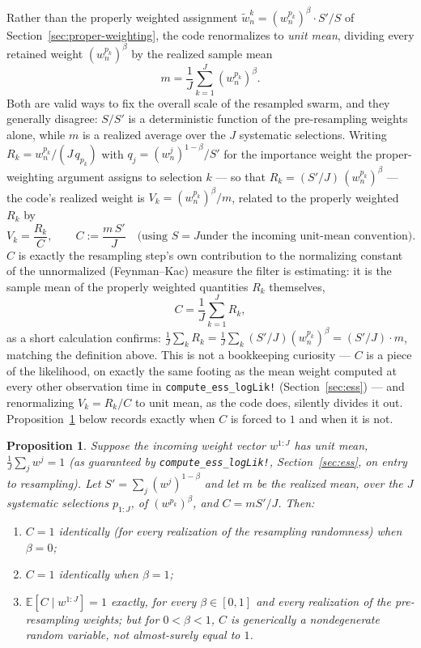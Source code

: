 \documentclass[11pt]{article}
\newtheorem{proposition}{Proposition}
\newcommand{\E}{\mathbb{E}}
\begin{document}
Rather than the properly weighted assignment $\tilde w_n^k = (w_n^{p_k})^\beta
\cdot S'/S$ of Section~\ref{sec:proper-weighting}, the code renormalizes to
\emph{unit mean}, dividing every retained weight $(w_n^{p_k})^\beta$ by the
realized sample mean
\[
m = \frac1J\sum_{k=1}^J (w_n^{p_k})^\beta.
\]
Both are valid ways to fix the overall scale of the resampled swarm, and
they generally disagree: $S/S'$ is a deterministic function of the
pre-resampling weights alone, while $m$ is a realized average over the $J$
systematic selections. Writing $R_k = w_n^{p_k}\big/(J\,q_{p_k})$ with
$q_j=(w_n^j)^{1-\beta}/S'$ for the importance weight the proper-weighting
argument assigns to selection $k$ — so that $R_k = (S'/J)\,(w_n^{p_k})^\beta$
— the code's realized weight is $V_k = (w_n^{p_k})^\beta/m$, related to the
properly weighted $R_k$ by
\[
V_k = \frac{R_k}{C}, \qquad C := \frac{m\,S'}{J} \quad \text{(using $S=J$
under the incoming unit-mean convention).}
\]
$C$ is exactly the resampling step's own contribution to the normalizing
constant of the unnormalized (Feynman--Kac) measure the filter is
estimating: it is the sample mean of the properly weighted quantities $R_k$
themselves,
\[
C = \frac1J\sum_{k=1}^J R_k,
\]
as a short calculation confirms: $\frac1J\sum_k R_k = \frac1J\sum_k
(S'/J)(w_n^{p_k})^\beta = (S'/J)\cdot m$, matching the definition above. This
is not a bookkeeping curiosity — $C$ is a piece of the likelihood, on exactly
the same footing as the mean weight computed at every other observation
time in \texttt{compute\_ess\_logLik!} (Section~\ref{sec:ess}) — and
renormalizing $V_k=R_k/C$ to unit mean, as the code does, silently divides
it out. Proposition~\ref{prop:normconst} below records exactly when $C$ is
forced to $1$ and when it is not.

\begin{proposition}
\label{prop:normconst}
Suppose the incoming weight vector $w^{1:J}$ has unit mean,
$\frac1J\sum_j w^j = 1$ (as guaranteed by \texttt{compute\_ess\_logLik!},
Section~\ref{sec:ess}, on entry to resampling). Let $S' = \sum_j
(w^j)^{1-\beta}$ and let $m$ be the realized mean, over the $J$ systematic
selections $p_{1:J}$, of $(w^{p_k})^\beta$, and $C = mS'/J$. Then:
\begin{enumerate}[label=(\alph*)]
\item $C = 1$ identically (for every realization of the resampling
randomness) when $\beta = 0$;
\item $C = 1$ identically when $\beta = 1$;
\item $\E[C\mid w^{1:J}] = 1$ exactly, for every $\beta\in[0,1]$ and every
realization of the pre-resampling weights; but for $0 < \beta < 1$, $C$ is
generically a nondegenerate random variable, not almost-surely equal to
$1$.
\end{enumerate}
\end{proposition}
\end{document}
